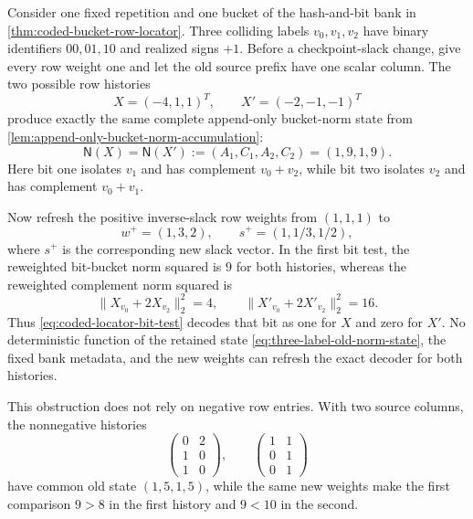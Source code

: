 \begin{proposition}
\label{prop:three-label-norm-only-reweight-obstruction}
Consider one fixed repetition and one bucket of the hash-and-bit bank in
\cref{thm:coded-bucket-row-locator}.  Three colliding labels
$v_0,v_1,v_2$ have binary identifiers $00,01,10$ and realized signs $+1$.
Before a checkpoint-slack change, give every row weight one and let the old
source prefix have one scalar column.  The two possible row histories
\begin{equation}
 X=(-4,1,1)^T,
 \qquad
 X'=(-2,-1,-1)^T
 \label{eq:three-label-reweight-histories}
\end{equation}
produce exactly the same complete append-only bucket-norm state from
\cref{lem:append-only-bucket-norm-accumulation}:
\begin{equation}
 \mathsf N(X)=\mathsf N(X')
 :=(A_1,C_1,A_2,C_2)=(1,9,1,9).
 \label{eq:three-label-old-norm-state}
\end{equation}
Here bit one isolates $v_1$ and has complement $v_0+v_2$, while bit two
isolates $v_2$ and has complement $v_0+v_1$.

Now refresh the positive inverse-slack row weights from $(1,1,1)$ to
\begin{equation}
 w^+=(1,3,2),
 \qquad
 s^+=(1,1/3,1/2),
 \label{eq:three-label-new-slack-weights}
\end{equation}
where $s^+$ is the corresponding new slack vector.  In the first bit test,
the reweighted bit-bucket norm squared is $9$ for both histories, whereas the
reweighted complement norm squared is
\begin{equation}
 \|X_{v_0}+2X_{v_2}\|_2^2=4,
 \qquad
 \|X'_{v_0}+2X'_{v_2}\|_2^2=16.
 \label{eq:three-label-reweight-flip}
\end{equation}
Thus \cref{eq:coded-locator-bit-test} decodes that bit as one for $X$ and
zero for $X'$.  No deterministic function of the retained state
\cref{eq:three-label-old-norm-state}, the fixed bank metadata, and the new
weights can refresh the exact decoder for both histories.

This obstruction does not rely on negative row entries.  With two source
columns, the nonnegative histories
\begin{equation*}
 \begin{pmatrix}0&2\\1&0\\1&0\end{pmatrix},
 \qquad
 \begin{pmatrix}1&1\\0&1\\0&1\end{pmatrix}
\end{equation*}
have common old state $(1,5,1,5)$, while the same new weights make the first
comparison $9>8$ in the first history and $9<10$ in the second.


\end{proposition}
